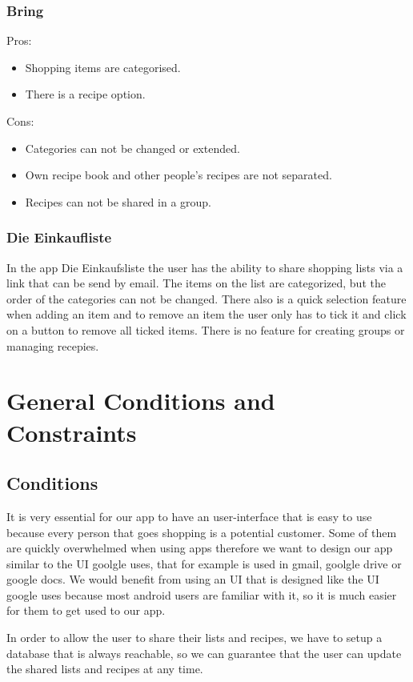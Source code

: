 \documentclass[12pt]{article}
\theoremstyle{definition}
\begin{document}
\subsubsection{Bring}
Pros:
\begin{itemize}
\item Shopping items are categorised.
\item There is a recipe option.\\
\end{itemize}
Cons:
\begin{itemize}
\item Categories can not be changed or extended.
\item Own recipe book and other people's recipes are not separated.
\item Recipes can not be shared in a group.
\end{itemize}
\subsubsection{Die Einkaufliste}
In the app Die Einkaufsliste the user has the ability to share shopping lists via a link that can be send by email. The items on the list are categorized, but the order of the categories can not be changed. There also is a quick selection feature when adding an item and to remove an item the user only has to tick it and click on a button to remove all ticked items. There  is no feature for creating groups or managing recepies.

\pagebreak

\section{General Conditions and Constraints}

\subsection{Conditions}
It is very essential for our app to have an user-interface that is easy to use because every person that goes shopping is a potential customer. Some of them are quickly overwhelmed when using apps therefore we want to design our app similar to the UI goolgle uses, that for example  is used in  gmail, goolgle drive or google docs. We would benefit from using an UI that is designed like the UI google uses because most android users are familiar with it, so it is much easier for them to get used to our app.

In order to allow the user to share their lists and recipes, we have to setup a database that is always reachable, so we can guarantee that the user can update the shared lists and recipes at any time.
\end{document}
